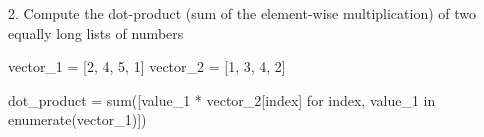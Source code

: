 2. Compute the dot-product (sum of the element-wise multiplication) of two equally long lists of numbers

\vspace{1em}

\begin{solution}
    \begin{pythoncode}
vector_1 = [2, 4, 5, 1]
vector_2 = [1, 3, 4, 2]

dot_product = sum([value_1 * vector_2[index] for index, value_1 in enumerate(vector_1)])
    \end{pythoncode}
\end{solution}


